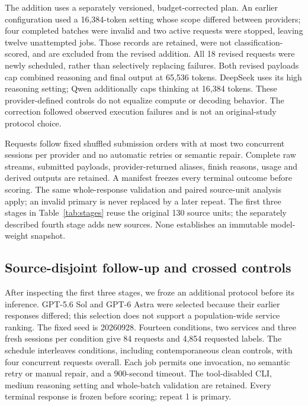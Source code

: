 \documentclass[11pt,a4paper]{article}
\begin{document}
The addition uses a separately versioned, budget-corrected plan. An earlier configuration used a 16,384-token setting whose scope differed between providers; four completed batches were invalid and two active requests were stopped, leaving twelve unattempted jobs. Those records are retained, were not classification-scored, and are excluded from the revised addition. All 18 revised requests were newly scheduled, rather than selectively replacing failures. Both revised payloads cap combined reasoning and final output at 65,536 tokens. DeepSeek uses its high reasoning setting; Qwen additionally caps thinking at 16,384 tokens. These provider-defined controls do not equalize compute or decoding behavior. The correction followed observed execution failures and is not an original-study protocol choice.

Requests follow fixed shuffled submission orders with at most two concurrent sessions per provider and no automatic retries or semantic repair. Complete raw streams, submitted payloads, provider-returned aliases, finish reasons, usage and derived outputs are retained. A manifest freezes every terminal outcome before scoring. The same whole-response validation and paired source-unit analysis apply; an invalid primary is never replaced by a later repeat. The first three stages in Table~\ref{tab:stages} reuse the original 130 source units; the separately described fourth stage adds new sources. None establishes an immutable model-weight snapshot.



\subsection{Source-disjoint follow-up and crossed controls}
After inspecting the first three stages, we froze an additional protocol before its inference. GPT-5.6 Sol and GPT-6 Astra were selected because their earlier responses differed; this selection does not support a population-wide service ranking. The fixed seed is 20260928. Fourteen conditions, two services and three fresh sessions per condition give 84 requests and 4,854 requested labels. The schedule interleaves conditions, including contemporaneous clean controls, with four concurrent requests overall. Each job permits one invocation, no semantic retry or manual repair, and a 900-second timeout. The tool-disabled CLI, medium reasoning setting and whole-batch validation are retained. Every terminal response is frozen before scoring; repeat 1 is primary.
\end{document}
